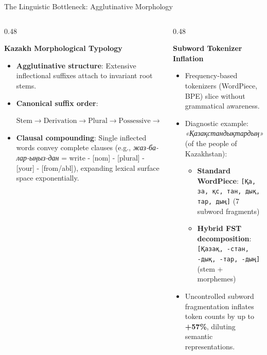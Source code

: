 \documentclass[aspectratio=169, 10pt]{beamer}
\newcommand{\subhead}[1]{{\normalsize\textbf{\color{DarkNavy}#1}\par\vspace{3pt}}}
\begin{document}
\begin{frame}{The Linguistic Bottleneck: Agglutinative Morphology}
    \begin{columns}[T]
        \begin{column}{0.48\textwidth}
            \subhead{Kazakh Morphological Typology}
            \begin{itemize}\setlength{\itemsep}{4pt}
                \item \textbf{Agglutinative structure}: Extensive inflectional suffixes attach to invariant root stems.
                \item \textbf{Canonical suffix order}: \\
                \centerline{\small $\text{Stem} \to \text{Derivation} \to \text{Plural} \to \text{Possessive} \to \text{Case}$}
                \item \textbf{Clausal compounding}: Single inflected words convey complete clauses (e.g., \textit{жаз-ба-лар-ыңыз-дан} = write - [nom] - [plural] - [your] - [from/abl]), expanding lexical surface space exponentially.
            \end{itemize}
        \end{column}
        \begin{column}{0.48\textwidth}
            \subhead{Subword Tokenizer Inflation}
            \begin{itemize}\setlength{\itemsep}{3pt}
                \item Frequency-based tokenizers (WordPiece, BPE) slice without grammatical awareness.
                \item Diagnostic example: \textit{«Қазақстандықтардың»} \color{SlateText}\footnotesize(of the people of Kazakhstan):
                \begin{itemize}\setlength{\itemsep}{2pt}
                    \item \color{AlertRed}\textbf{Standard WordPiece}: \texttt{\footnotesize[Қа, за, қс, тан, дық, тар, дың]} (7 subword fragments)
                    \item \color{AccentGreen}\textbf{Hybrid FST decomposition}: \texttt{\footnotesize[Қазақ, -стан, -дық, -тар, -дың]} (stem + morphemes)
                \end{itemize}
                \item Uncontrolled subword fragmentation inflates token counts by up to \textbf{+57\%}, diluting semantic representations.
            \end{itemize}
        \end{column}
    \end{columns}
\end{frame}
\end{document}
